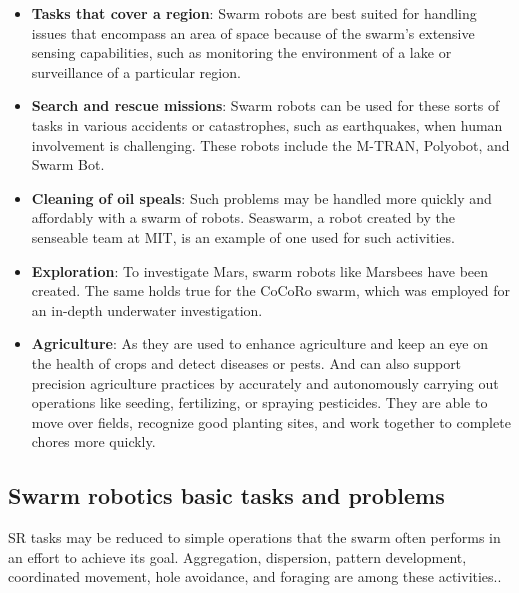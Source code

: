\documentclass[12pt]{extarticle}
\begin{document}
\begin{itemize}

\item \textbf{Tasks that cover a region}: Swarm robots are best suited for handling issues that encompass an area of space because of the swarm's extensive sensing capabilities, such as monitoring the environment of a lake or surveillance of a particular region.
\item \textbf{Search and rescue missions}: Swarm robots can be used for these sorts of tasks in various accidents or catastrophes, such as earthquakes, when human involvement is challenging. These robots include the M-TRAN, Polyobot, and Swarm Bot.
\item \textbf{Cleaning of oil speals}: Such problems may be handled more quickly and affordably with a swarm of robots. Seaswarm, a robot created by the senseable team at MIT, is an example of one used for such activities.
\item \textbf{Exploration}: To investigate Mars, swarm robots like Marsbees have been created. The same holds true for the CoCoRo swarm, which was employed for an in-depth underwater investigation.
\item \textbf{Agriculture}: As they are  used to enhance agriculture and keep an eye on the health of crops and detect diseases or pests. And can also support precision agriculture practices by accurately and autonomously carrying out operations like seeding, fertilizing, or spraying pesticides. They are able to move over fields, recognize good planting sites, and work together to complete chores more quickly. 


\end{itemize}





\subsection{Swarm robotics basic tasks and problems}
SR tasks may be reduced to simple operations that the swarm often performs in an effort to achieve its goal.
Aggregation, dispersion, pattern development, coordinated movement, hole avoidance, and foraging are among these activities.\cite{bayindir2007review}\cite{navarro2013introduction}.
\end{document}
